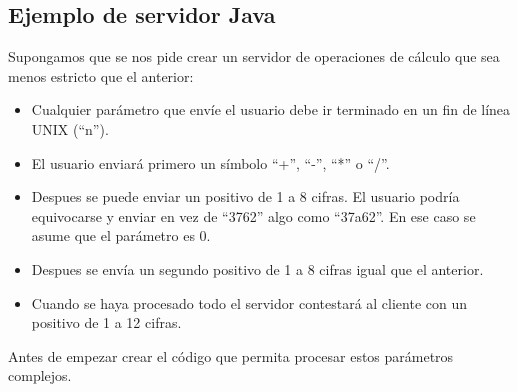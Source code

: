 \documentclass[a4paper,12pt,spanish]{sphinxmanual}
\begin{document}
\subsection{Ejemplo de servidor Java}
\label{textos/tema3:ejemplo-de-servidor-java}
Supongamos que se nos pide crear un servidor de operaciones de cálculo que sea menos estricto que el anterior:
\begin{itemize}
\item {} 
Cualquier parámetro que envíe el usuario debe ir terminado en un fin de línea UNIX (``n'').

\item {} 
El usuario enviará primero un símbolo ``+'', ``-'', ``*'' o ``/''.

\item {} 
Despues se puede enviar un positivo de 1 a 8 cifras. El usuario podría equivocarse y enviar en vez de ``3762'' algo como ``37a62''. En ese caso se asume que el parámetro es 0.

\item {} 
Despues se envía un segundo positivo de 1 a 8 cifras igual que el anterior.

\item {} 
Cuando se haya procesado todo el servidor contestará al cliente con un positivo de 1 a 12 cifras.

\end{itemize}

Antes de empezar crear el código que permita procesar estos parámetros complejos.
\end{document}
